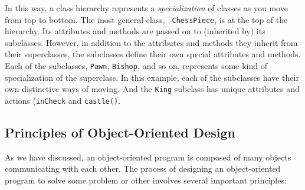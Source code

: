 In this way, a class hierarchy represents a {\em specialization} of
classes as you move from top to bottom. The most general class, {\tt
ChessPiece}, is at the top of the hierarchy.  Its attributes and
methods are passed on to (inherited by) its subclasses. However, in
addition to the attributes and methods they inherit from their
superclasses, the subclasses define their own special attributes and
methods. Each of the subclasses, {\tt Pawn}, {\tt Bishop}, and so on,
represents some kind of specialization of the superclass. In this
example, each of the subclasses have their own distinctive ways of
moving. And the {\tt King} subclass has unique attributes and actions
({\tt inCheck} and {\tt castle()}.


\subsection{Principles of \mbox{Object-Oriented} Design}

\noindent As we have discussed, an object-oriented program is composed
of many objects communicating with each other. The process of
designing an object-oriented program to solve some problem or other
involves several important principles:

